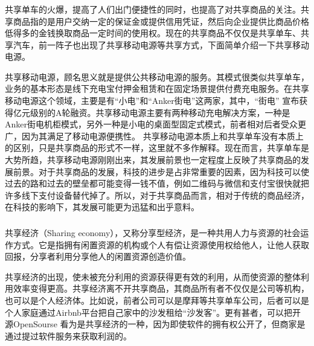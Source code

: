 \documentclass[11pt]{ctexart} %
\begin{document}
\subsubsection*{}
\paragraph{}
  共享单车的火爆，提高了人们出门便捷性的同时，也提高了对共享商品的关注。共享商品指的是用户交纳一定的保证金或提供信用凭证，然后向企业提供比商品价格低得多的金钱换取商品一定时间的使用权。现在的共享商品不仅仅是共享单车、共享汽车，前一阵子也出现了共享移动电源等共享方式，下面简单介绍一下共享移动电源。
  
  共享移动电源，顾名思义就是提供公共移动电源的服务。其模式很类似共享单车，业务的基本形态是线下充电宝付押金租赁和在固定场景提供付费充电服务。在共享移动电源这个领域，主要是有“小电”和“Anker街电”这两家，其中，“街电” 宣布获得亿元级别的A轮融资。共享移动电源主要有两种移动充电解决方案，一种是Anker街电机柜模式，另外一种是小电的桌面型固定式模式，前者相对后者受众更广，因为其满足了移动电源便携性。
  共享移动电源本质上和共享单车没有本质上的区别，只是共享商品的形式不一样，这里就不多作解释。现在而言，共享单车是大势所趋，共享移动电源刚刚出来，其发展前景也一定程度上反映了共享商品的发展前景。对于共享商品的发展，科技的进步是占非常重要的因素，因为科技可以使过去的路和过去的壁垒都可能变得一钱不值，例如二维码与微信和支付宝很快就把许多线下支付设备替代掉了。所以，对于共享商品而言，相对于传统的商品经济，在科技的影响下，其发展可能更为迅猛和出乎意料。

\subsubsection*{}
\paragraph{}
共享经济（Sharing economy），又称分享型经济，是一种共用人力与资源的社会运作方式。它是指拥有闲置资源的机构或个人有偿让资源使用权给他人，让他人获取回报，分享者利用分享他人的闲置资源创造价值。

共享经济的出现，使未被充分利用的资源获得更有效的利用，从而使资源的整体利用效率变得更高。共享经济离不开共享商品，其商品所有者不仅仅是公司等机构，也可以是个人经济体。比如说，前者公司可以是摩拜等共享单车公司，后者可以是个人家庭通过Airbnb平台把自己家中的沙发租给“沙发客”。更有甚者，可以把开源OpenSourse 看为是共享经济的一种，因为即使软件的拥有权公开了，但商家是通过提过软件服务来获取利润的。
\end{document}

